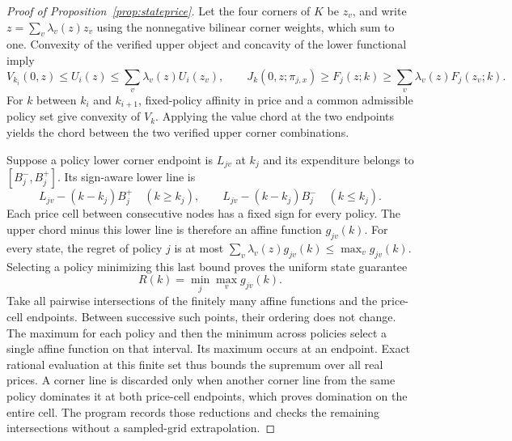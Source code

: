\begin{proof}[Proof of Proposition~\ref{prop:stateprice}]
Let the four corners of $K$ be $z_v$, and write $z=\sum_v\lambda_v(z)z_v$ using the nonnegative bilinear corner weights, which sum to one. Convexity of the verified upper object and concavity of the lower functional imply
\[
 V_{k_i}(0,z)\leq U_i(z)\leq\sum_v\lambda_v(z)U_i(z_v),\qquad
 J_k(0,z;\pi_{j,x})\geq F_j(z;k)\geq\sum_v\lambda_v(z)F_j(z_v;k).
\]
For $k$ between $k_i$ and $k_{i+1}$, fixed-policy affinity in price and a common admissible policy set give convexity of $V_k$. Applying the value chord at the two endpoints yields the chord between the two verified upper corner combinations.

Suppose a policy lower corner endpoint is $L_{jv}$ at $k_j$ and its expenditure belongs to $[B_j^-,B_j^+]$. Its sign-aware lower line is
\[
 L_{jv}-(k-k_j)B_j^+\quad(k\geq k_j),\qquad
 L_{jv}-(k-k_j)B_j^-\quad(k\leq k_j).
\]
Each price cell between consecutive nodes has a fixed sign for every policy. The upper chord minus this lower line is therefore an affine function $g_{jv}(k)$. For every state, the regret of policy $j$ is at most
$\sum_v\lambda_v(z)g_{jv}(k)\leq\max_v g_{jv}(k)$.
Selecting a policy minimizing this last bound proves the uniform state guarantee
\[
 R(k)=\min_j\max_v g_{jv}(k).
\]
Take all pairwise intersections of the finitely many affine functions and the price-cell endpoints. Between successive such points, their ordering does not change. The maximum for each policy and then the minimum across policies select a single affine function on that interval. Its maximum occurs at an endpoint. Exact rational evaluation at this finite set thus bounds the supremum over all real prices. A corner line is discarded only when another corner line from the same policy dominates it at both price-cell endpoints, which proves domination on the entire cell. The program records those reductions and checks the remaining intersections without a sampled-grid extrapolation.
\end{proof}

